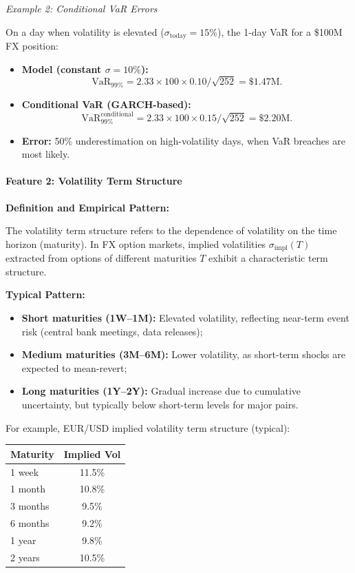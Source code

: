 \textit{Example 2: Conditional VaR Errors}

On a day when volatility is elevated ($\sigma_{\text{today}} = 15\%$), the 1-day VaR for a \$100M FX position:
\begin{itemize}
	\item \textbf{Model (constant $\sigma = 10\%$):} 
	\begin{equation}
		\text{VaR}_{99\%} = 2.33 \times 100 \times 0.10/\sqrt{252} = \$1.47\text{M}.
	\end{equation}
	
	\item \textbf{Conditional VaR (GARCH-based):}
	\begin{equation}
		\text{VaR}_{99\%}^{\text{conditional}} = 2.33 \times 100 \times 0.15/\sqrt{252} = \$2.20\text{M}.
	\end{equation}
	
	\item \textbf{Error:} 50\% underestimation on high-volatility days, when VaR breaches are most likely.
\end{itemize}

\paragraph{Feature 2: Volatility Term Structure}

\textbf{Definition and Empirical Pattern:}

The volatility term structure refers to the dependence of volatility on the time horizon (maturity). In FX option markets, implied volatilities $\sigma_{\text{impl}}(T)$ extracted from options of different maturities $T$ exhibit a characteristic term structure.

\textbf{Typical Pattern:}

\begin{itemize}
	\item \textbf{Short maturities (1W--1M):} Elevated volatility, reflecting near-term event risk (central bank meetings, data releases);
	\item \textbf{Medium maturities (3M--6M):} Lower volatility, as short-term shocks are expected to mean-revert;
	\item \textbf{Long maturities (1Y--2Y):} Gradual increase due to cumulative uncertainty, but typically below short-term levels for major pairs.
\end{itemize}

For example, EUR/USD implied volatility term structure (typical):
\begin{center}
	\begin{tabular}{|l|c|}
		\hline
		\textbf{Maturity} & \textbf{Implied Vol} \\
		\hline
		1 week & 11.5\% \\
		1 month & 10.8\% \\
		3 months & 9.5\% \\
		6 months & 9.2\% \\
		1 year & 9.8\% \\
		2 years & 10.5\% \\
		\hline
	\end{tabular}
\end{center}

